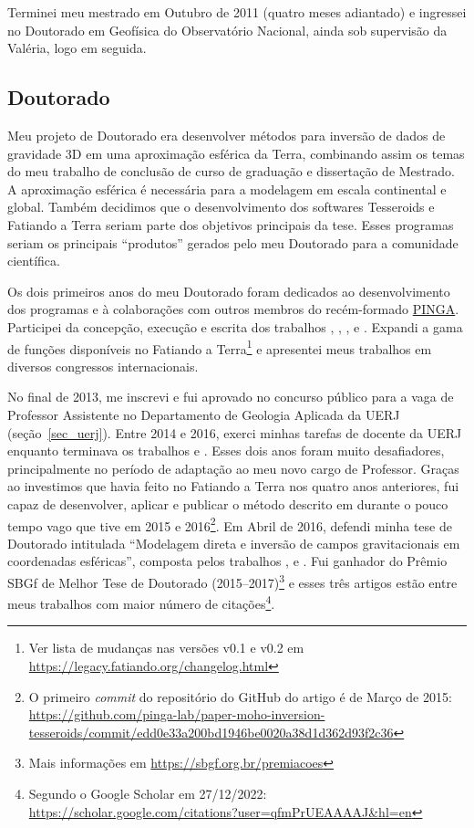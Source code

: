 \documentclass[10pt,a4paper,oneside]{book}
\begin{document}
Terminei meu mestrado em Outubro de 2011 (quatro meses adiantado) e ingressei
no Doutorado em Geofísica do Observatório Nacional, ainda sob supervisão da
Valéria, logo em seguida.

\subsection{Doutorado}
\label{sec_doutorado}

Meu projeto de Doutorado era desenvolver métodos para inversão de dados de
gravidade 3D em uma aproximação esférica da Terra, combinando assim os temas
do meu trabalho de conclusão de curso de graduação e dissertação de Mestrado.
A aproximação esférica é necessária para a modelagem em escala continental e
global.
Também decidimos que o desenvolvimento dos softwares Tesseroids e Fatiando a
Terra seriam parte dos objetivos principais da tese.
Esses programas seriam os principais ``produtos'' gerados pelo meu Doutorado
para a comunidade científica.

Os dois primeiros anos do meu Doutorado foram dedicados ao desenvolvimento dos
programas e à colaborações com outros membros do recém-formado
\href{https://www.pinga-lab.org}{PINGA}.
Participei da concepção, execução e escrita dos trabalhos
\citet{OliveiraJr2013}, \citet{Melo2013}, \citet{Carlos2014},
\citet{OliveiraJr2015} e \citet{Carlos2016}.
Expandi a gama de funções disponíveis no Fatiando a Terra\footnote{Ver lista
de mudanças nas versões v0.1 e v0.2 em \url{https://legacy.fatiando.org/changelog.html}}
e apresentei meus trabalhos em diversos congressos internacionais.

No final de 2013, me inscrevi e fui aprovado no concurso público para a vaga de
Professor Assistente no Departamento de Geologia Aplicada da UERJ
(seção~\ref{sec_uerj}).
Entre 2014 e 2016, exerci minhas tarefas de docente da UERJ enquanto terminava
os trabalhos \citet{Uieda2016} e \citet{Uieda2017}.
Esses dois anos foram muito desafiadores, principalmente no período de
adaptação ao meu novo cargo de Professor.
Graças ao investimos que havia feito no Fatiando a Terra nos quatro anos
anteriores, fui capaz de desenvolver, aplicar e publicar o método descrito em
\citet{Uieda2017} durante o pouco tempo vago que tive em 2015 e
2016\footnote{O primeiro \textit{commit} do repositório do GitHub do artigo é
de Março de 2015: \url{https://github.com/pinga-lab/paper-moho-inversion-tesseroids/commit/edd0e33a200bd1946be0020a38d1d362d93f2c36}}.
Em Abril de 2016, defendi minha tese de Doutorado intitulada ``Modelagem direta
e inversão de campos gravitacionais em coordenadas esféricas'', composta pelos
trabalhos \citet{Uieda2013}, \citet{Uieda2016} e \citet{Uieda2017}.
Fui ganhador do Prêmio SBGf de Melhor Tese de Doutorado
(2015--2017)\footnote{Mais informações em \url{https://sbgf.org.br/premiacoes}}
e esses três artigos estão entre meus trabalhos com maior número de
citações\footnote{Segundo o Google Scholar em 27/12/2022:
\url{https://scholar.google.com/citations?user=qfmPrUEAAAAJ&hl=en}}.
\end{document}
